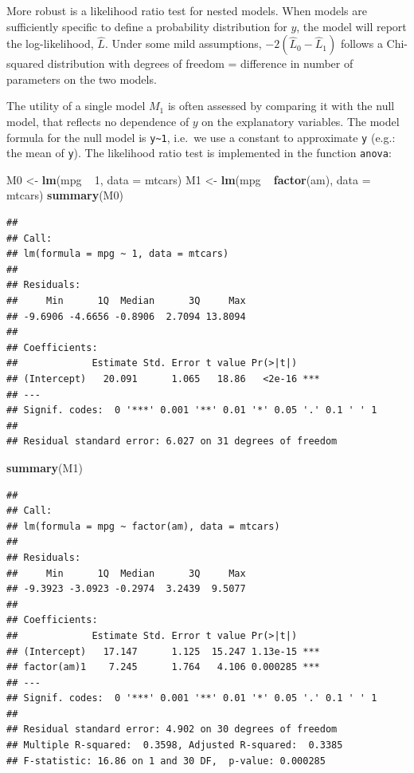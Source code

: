 \documentclass[]{article}
\newenvironment{Shaded}{\begin{snugshade}}{\end{snugshade}}
\newcommand{\KeywordTok}[1]{\textcolor[rgb]{0.13,0.29,0.53}{\textbf{{#1}}}}
\newcommand{\DataTypeTok}[1]{\textcolor[rgb]{0.13,0.29,0.53}{{#1}}}
\newcommand{\DecValTok}[1]{\textcolor[rgb]{0.00,0.00,0.81}{{#1}}}
\newcommand{\StringTok}[1]{\textcolor[rgb]{0.31,0.60,0.02}{{#1}}}
\newcommand{\NormalTok}[1]{{#1}}
\numberwithin{equation}{section}
\begin{document}
More robust is a likelihood ratio test for nested models. When models
are sufficiently specific to define a probability distribution for
\(y\), the model will report the log-likelihood, \(\hat{L}\). Under some
mild assumptions, \(-2(\hat{L}_0 - \hat{L}_1)\) follows a Chi-squared
distribution with degrees of freedom = difference in number of
parameters on the two models.

The utility of a single model \(M_1\) is often assessed by comparing it
with the null model, that reflects no dependence of \(y\) on the
explanatory variables. The model formula for the null model is
\texttt{y\textasciitilde{}1}, i.e.~we use a constant to approximate
\texttt{y} (e.g.: the mean of \texttt{y}). The likelihood ratio test is
implemented in the function \texttt{anova}:

\begin{Shaded}
\begin{Highlighting}[]
\NormalTok{M0 <-}\StringTok{ }\KeywordTok{lm}\NormalTok{(mpg ~}\StringTok{ }\DecValTok{1}\NormalTok{, }\DataTypeTok{data =} \NormalTok{mtcars)}
\NormalTok{M1 <-}\StringTok{ }\KeywordTok{lm}\NormalTok{(mpg ~}\StringTok{ }\KeywordTok{factor}\NormalTok{(am), }\DataTypeTok{data =} \NormalTok{mtcars)}
\KeywordTok{summary}\NormalTok{(M0)}
\end{Highlighting}
\end{Shaded}

\begin{verbatim}
## 
## Call:
## lm(formula = mpg ~ 1, data = mtcars)
## 
## Residuals:
##     Min      1Q  Median      3Q     Max 
## -9.6906 -4.6656 -0.8906  2.7094 13.8094 
## 
## Coefficients:
##             Estimate Std. Error t value Pr(>|t|)    
## (Intercept)   20.091      1.065   18.86   <2e-16 ***
## ---
## Signif. codes:  0 '***' 0.001 '**' 0.01 '*' 0.05 '.' 0.1 ' ' 1
## 
## Residual standard error: 6.027 on 31 degrees of freedom
\end{verbatim}

\begin{Shaded}
\begin{Highlighting}[]
\KeywordTok{summary}\NormalTok{(M1)}
\end{Highlighting}
\end{Shaded}

\begin{verbatim}
## 
## Call:
## lm(formula = mpg ~ factor(am), data = mtcars)
## 
## Residuals:
##     Min      1Q  Median      3Q     Max 
## -9.3923 -3.0923 -0.2974  3.2439  9.5077 
## 
## Coefficients:
##             Estimate Std. Error t value Pr(>|t|)    
## (Intercept)   17.147      1.125  15.247 1.13e-15 ***
## factor(am)1    7.245      1.764   4.106 0.000285 ***
## ---
## Signif. codes:  0 '***' 0.001 '**' 0.01 '*' 0.05 '.' 0.1 ' ' 1
## 
## Residual standard error: 4.902 on 30 degrees of freedom
## Multiple R-squared:  0.3598, Adjusted R-squared:  0.3385 
## F-statistic: 16.86 on 1 and 30 DF,  p-value: 0.000285
\end{verbatim}
\end{document}
